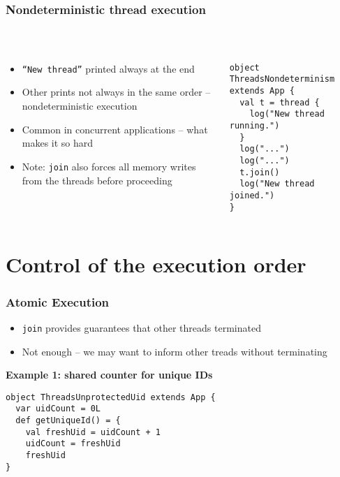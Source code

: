 \documentclass[aspectratio=169]{beamer}
\begin{document}
\begin{frame}[fragile]\frametitle{Nondeterministic thread execution}
~\\[-8mm]
\begin{columns}
\begin{column}{0.49\textwidth}
\begin{itemize}
  \item \texttt{``New thread''} printed always at the end
  \item Other prints not always in the same order -- nondeterministic execution
  \item Common in concurrent applications -- what makes it so hard
  \item Note: \texttt{join} also forces all memory writes from the threads before proceeding
\end{itemize}

\end{column}
\begin{column}{0.49\textwidth}
\begin{lstlisting}[emph={sleep,log,thread,join}]
object ThreadsNondeterminism extends App {
  val t = thread {
    log("New thread running.")
  }
  log("...")
  log("...")
  t.join()
  log("New thread joined.")
}
\end{lstlisting}
\end{column}
\end{columns}
\end{frame}


\section{Control of the execution order}

\begin{frame}[fragile]\frametitle{Atomic Execution}
\begin{itemize}
  \item \texttt{join} provides guarantees that other threads terminated
  \item Not enough -- we may want to inform other treads without terminating
\end{itemize}

\textbf{Example 1: shared counter for unique IDs}
\begin{lstlisting}[emph={sleep,log,thread,join}]
object ThreadsUnprotectedUid extends App {
  var uidCount = 0L
  def getUniqueId() = {
    val freshUid = uidCount + 1
    uidCount = freshUid
    freshUid
}
\end{lstlisting}

\end{frame}
\end{document}
